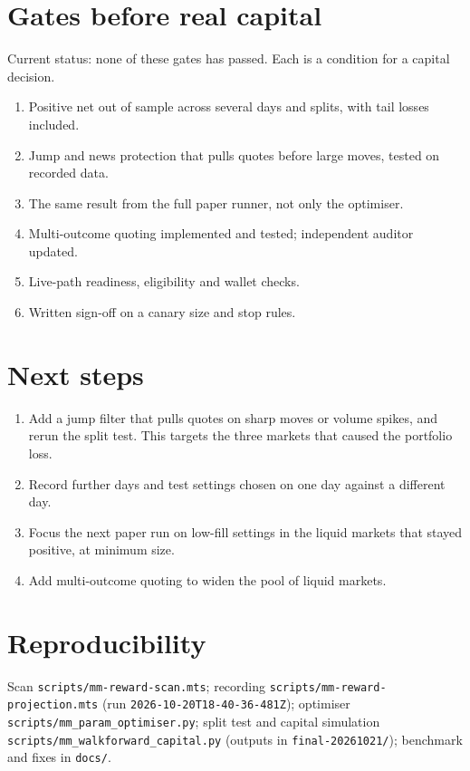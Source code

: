 \documentclass[11pt,a4paper]{article}
\begin{document}
\section{Gates before real capital}\label{sec:gates}
\begin{warn}
Current status: none of these gates has passed. Each is a condition for a capital decision.
\end{warn}
\begin{enumerate}[leftmargin=1.5em]
  \item Positive net out of sample across several days and splits, with tail losses included.
  \item Jump and news protection that pulls quotes before large moves, tested on recorded data.
  \item The same result from the full paper runner, not only the optimiser.
  \item Multi-outcome quoting implemented and tested; independent auditor updated.
  \item Live-path readiness, eligibility and wallet checks.
  \item Written sign-off on a canary size and stop rules.
\end{enumerate}

\section{Next steps}
\begin{enumerate}[leftmargin=1.5em]
  \item Add a jump filter that pulls quotes on sharp moves or volume spikes, and rerun the split test. This targets the three markets that caused the portfolio loss.
  \item Record further days and test settings chosen on one day against a different day.
  \item Focus the next paper run on low-fill settings in the liquid markets that stayed positive, at minimum size.
  \item Add multi-outcome quoting to widen the pool of liquid markets.
\end{enumerate}

\section*{Reproducibility}
\small
Scan \texttt{scripts/mm-reward-scan.mts}; recording \texttt{scripts/mm-reward-projection.mts} (run \texttt{2026-10-20T18-40-36-481Z}); optimiser \texttt{scripts/mm\_param\_optimiser.py}; split test and capital simulation \texttt{scripts/mm\_walkforward\_capital.py} (outputs in \texttt{final-20261021/}); benchmark and fixes in \texttt{docs/}.
\end{document}
